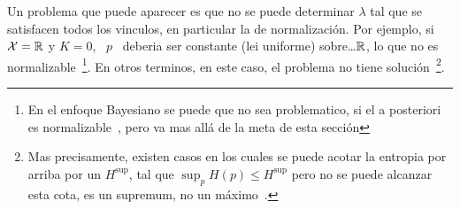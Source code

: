 Un problema que  puede aparecer es que no se puede  determinar $\lambda$ tal que
se  satisfacen todos  los vinculos,  en particular  la de  normalizaci\'on.  Por
ejemplo, si $\mathcal{X} = \mathbb{R}$ y $K = 0$, \ $p$ \ deberia ser constante (lei uniforme)
sobre\ldots $\mathbb{R}$, lo que no es normalizable~\footnote{En el enfoque Bayesiano
  se   puede    que   no   sea    problematico,   si   el   a    posteriori   es
  normalizable~\cite{Rob07}, pero va  mas all\'a de la meta  de esta secci\'on}.
En otros terminos,  en este caso, el problema  no tiene soluci\'on~\footnote{Mas
  precisamente,  existen casos en  los cuales  se puede  acotar la  entropia por
  arriba por un $H^{\sup}$, tal que  $\sup_p H(p) \le H^{\sup}$ pero no se puede
  alcanzar     esta     cota,     \ie      es     un     supremum,     no     un
  m\'aximo~\cite[sec.~12.3]{CovTho06}.}.

